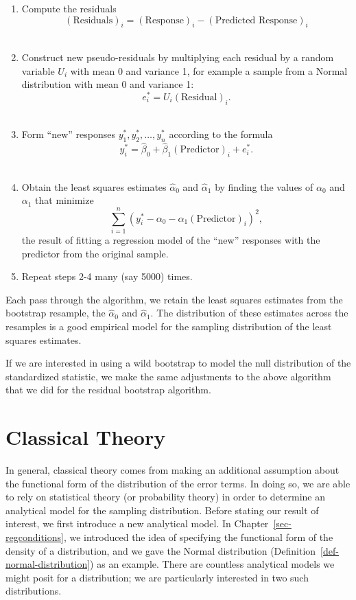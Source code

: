 \documentclass[
  letterpaper,
  DIV=11,
  numbers=noendperiod]{scrreprt}
\providecommand{\tightlist}{%
  \setlength{\itemsep}{0pt}\setlength{\parskip}{0pt}}\usepackage{longtable,booktabs,array}
\theoremstyle{definition}
\theoremstyle{definition}
\theoremstyle{plain}
\theoremstyle{remark}
\begin{document}
\begin{enumerate}
\def\labelenumi{\arabic{enumi}.}
\tightlist
\item
  Compute the residuals
  \[(\text{Residuals})_i = (\text{Response})_i - (\text{Predicted Response})_i\]\\
\item
  Construct new pseudo-residuals by multiplying each residual by a
  random variable \(U_i\) with mean 0 and variance 1, for example a
  sample from a Normal distribution with mean 0 and variance 1:
  \[e_i^* = U_i (\text{Residual})_i.\]\\
\item
  Form ``new'' responses \(y_1^*, y_2^*, \dotsc, y_n^*\) according to
  the formula
  \[y_i^* = \widehat{\beta}_0 + \widehat{\beta}_1 (\text{Predictor})_i + e_i^*.\]\\
\item
  Obtain the least squares estimates \(\widehat{\alpha}_0\) and
  \(\widehat{\alpha}_1\) by finding the values of \(\alpha_0\) and
  \(\alpha_1\) that minimize
  \[\sum_{i=1}^{n} \left(y_i^* - \alpha_0 - \alpha_1 (\text{Predictor})_i\right)^2,\]
  the result of fitting a regression model of the ``new'' responses with
  the predictor from the original sample.\\
\item
  Repeat steps 2-4 many (say 5000) times.
\end{enumerate}

Each pass through the algorithm, we retain the least squares estimates
from the bootstrap resample, the \(\widehat{\alpha}_0\) and
\(\widehat{\alpha}_1\). The distribution of these estimates across the
resamples is a good empirical model for the sampling distribution of the
least squares estimates.

If we are interested in using a wild bootstrap to model the null
distribution of the standardized statistic, we make the same adjustments
to the above algorithm that we did for the residual bootstrap algorithm.

\section{Classical Theory}\label{classical-theory}

In general, classical theory comes from making an additional assumption
about the functional form of the distribution of the error terms. In
doing so, we are able to rely on statistical theory (or probability
theory) in order to determine an analytical model for the sampling
distribution. Before stating our result of interest, we first introduce
a new analytical model. In Chapter~\ref{sec-regconditions}, we
introduced the idea of specifying the functional form of the density of
a distribution, and we gave the Normal distribution
(Definition~\ref{def-normal-distribution}) as an example. There are
countless analytical models we might posit for a distribution; we are
particularly interested in two such distributions.
\end{document}
